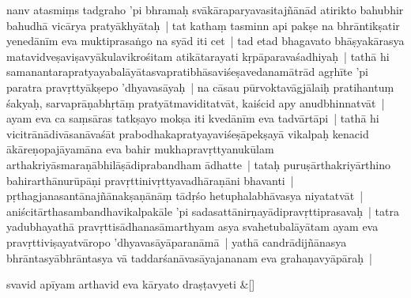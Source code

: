 \documentclass[article,12pt,a4paper]{memoir}%
\newcommand{\persName}[1]{#1}
\newcounter{parCount}
\begin{document}
	  
	  \pstart \leavevmode%
	\label{thakur75-137.6}nanv atasmiṃs tadgraho 'pi bhramaḥ svā\label{capv-np-10a-end}\label{capv-np-10b-start}kāraparyavasitajñānād atirikto bahubhir bahudhā vicārya pratyākhyātaḥ | tat kathaṃ tasminn api pakṣe na bhrāntikṣatir yenedānīm eva muktiprasaṅgo na syād iti cet | tad etad bhagavato \persName{bhāṣyakārasya} matavidveṣaviṣavyākulavikrośitam atikātarayati kṛpāparavaśadhiyaḥ | tathā hi samanantarapratyayabalāyātasvapratibhāsaviśeṣavedanamātrād agṛhīte 'pi paratra pravṛttyākṣepo 'dhyavasāyaḥ | na cāsau pūrvoktavāgjālaiḥ pratihantuṃ śakyaḥ, sarvaprāṇabhṛtāṃ pratyātmaviditatvāt, kaiścid apy anudbhinnatvāt | ayam eva ca saṃsāras tatkṣayo mokṣa iti kvedānīm eva tadvārtāpi | tathā hi vicitrānādivāsanāvaśāt prabodhakapratyayaviśeṣāpekṣayā vikalpaḥ kenacid ākāreṇopajāyamāna eva bahir mukhapravṛttyanukūlam arthakriyāsmaraṇābhilāṣādiprabandham ādhatte | tataḥ puruṣārthakriyārthino bahirarthānurūpāṇi pravṛttinivṛttyavadhāraṇāni bhavanti | pṛthagjanasantānajñāna\label{ratnakīrtinibandhāvali__36r1PF7IMS1N1FWQDPUYFL9R0TC}kṣaṇānāṃ\label{ratnakīrtinibandhāvali__36r1PF7IMRZL0VOIHDHNC5NEYNP} tādṛśo hetuphalabhāvasya niyatatvāt | aniścitārthasambandhavikalpakāle 'pi sada\label{capv-np-10b-end}sattānirṇayādipravṛttiprasavaḥ | tatra yadubhayathā pravṛttisādhanasāmarthyam asya svahetubalāyātam ayam eva pravṛttiviṣayatvāropo 'dhyavasāyāparanāmā | yathā candrādijñānasya bhrāntasyābhrāntasya vā taddarśanāvasāyajananam eva grahaṇavyāpāraḥ |
	{}
	\pend%
      
	    
	    \stanza[\smallbreak]
	  svavid apīyam arthavid eva kāryato draṣṭavyeti \&[\smallbreak]
	  
	  
	  
\end{document}
